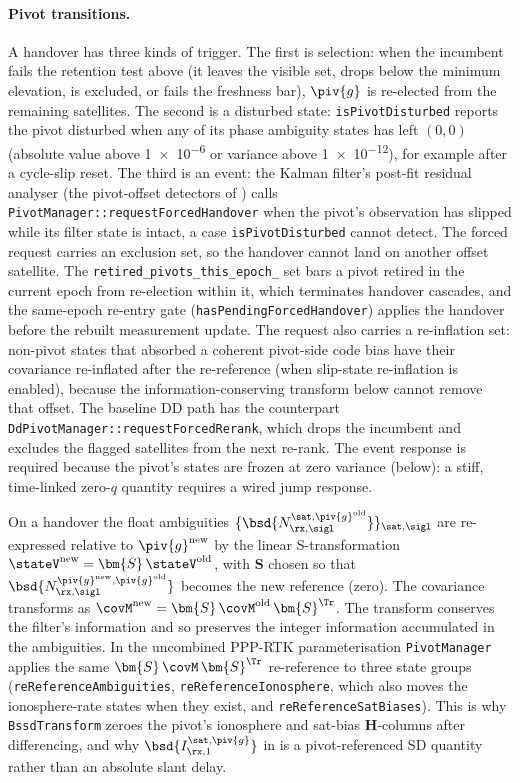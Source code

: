 \paragraph{Pivot transitions.}
A handover has three kinds of trigger.  The first is selection: when the incumbent
fails the retention test above (it leaves the visible set, drops below the minimum
elevation, is excluded, or fails the freshness bar), $\piv{g}$ is re-elected from
the remaining satellites.  The second is a disturbed state:
\texttt{isPivotDisturbed} reports the pivot disturbed when any of its phase
ambiguity states has left $(0,0)$ (absolute value above \num{1e-6} or variance
above \num{1e-12}), for example after a cycle-slip reset.  The third is an event: the
Kalman filter's post-fit residual analyser (the pivot-offset detectors of
) calls
\texttt{PivotManager::requestForcedHandover} when the pivot's observation has
slipped while its filter state is intact, a case \texttt{isPivotDisturbed} cannot
detect.  The forced request carries an exclusion set, so the handover cannot land on
another offset satellite.  The \texttt{retired\_pivots\_this\_epoch\_} set bars a
pivot retired in the current epoch from re-election within it, which terminates
handover cascades, and the same-epoch re-entry gate
(\texttt{hasPendingForcedHandover}) applies the handover before the rebuilt
measurement update.  The request also carries a re-inflation set: non-pivot states
that absorbed a coherent pivot-side code bias have their covariance re-inflated
after the re-reference (when slip-state re-inflation is enabled), because the
information-conserving transform below cannot remove that offset.  The baseline DD
path has the counterpart \texttt{DdPivotManager::requestForcedRerank}, which drops
the incumbent and excludes the flagged satellites from the next re-rank.  The event
response is required because the pivot's states are frozen at zero variance (below):
a stiff, time-linked zero-$q$ quantity requires a wired jump response.

On a handover the float ambiguities
$\{\bsd{N^{\sat,\piv{g}^{\mathrm{old}}}_{\rx,\sigl}}\}_{\sat,\sigl}$
are re-expressed relative to $\piv{g}^{\mathrm{new}}$ by the linear
S-transformation $\stateV^{\mathrm{new}} = \bm{S}\,\stateV^{\mathrm{old}}$, with
$\bm{S}$ chosen so that
$\bsd{N^{\piv{g}^{\mathrm{new}},\piv{g}^{\mathrm{old}}}_{\rx,\sigl}}$
becomes the new reference (zero).  The covariance transforms as
$\covM^{\mathrm{new}} = \bm{S}\,\covM^{\mathrm{old}}\,\bm{S}^{\Tr}$.  The transform
conserves the filter's information and so preserves the integer information
accumulated in the ambiguities.  In the uncombined PPP-RTK parameterisation
\texttt{PivotManager} applies the same $\bm{S}\,\covM\,\bm{S}^{\Tr}$ re-reference to
three state groups (\texttt{reReferenceAmbiguities}, \texttt{reReferenceIonosphere},
which also moves the ionosphere-rate states when they exist, and
\texttt{reReferenceSatBiases}).  This is why \texttt{BssdTransform} zeroes the
pivot's ionosphere and sat-bias $\bm{H}$-columns after differencing, and why
$\bsd{I^{\sat,\piv{g}}_{\rx,1}}$ in  is a
pivot-referenced SD quantity rather than an absolute slant delay.

